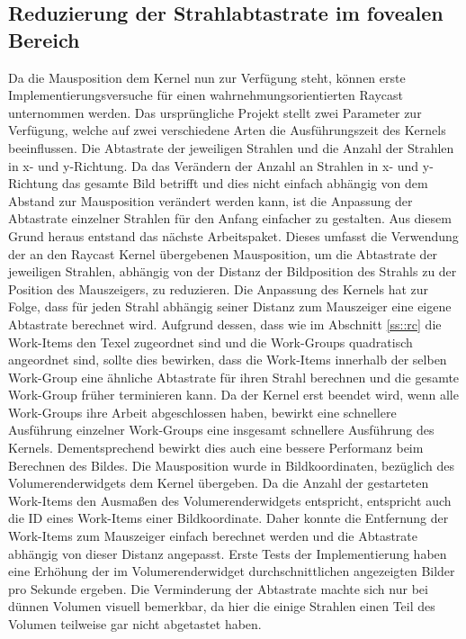\subsection*{Reduzierung der Strahlabtastrate im fovealen Bereich}
Da die Mausposition dem Kernel nun zur Verfügung steht, können erste Implementierungsversuche für einen wahrnehmungsorientierten Raycast unternommen werden.
Das ursprüngliche Projekt stellt zwei Parameter zur Verfügung, welche auf zwei verschiedene Arten die Ausführungszeit des Kernels beeinflussen.
Die Abtastrate der jeweiligen Strahlen und die Anzahl der Strahlen in x- und y-Richtung.
Da das Verändern der Anzahl an Strahlen in x- und y- Richtung das gesamte Bild betrifft und dies nicht einfach abhängig von dem Abstand zur Mausposition verändert werden kann, ist die Anpassung der Abtastrate einzelner Strahlen für den Anfang einfacher zu gestalten.
Aus diesem Grund heraus entstand das nächste Arbeitspaket.
Dieses umfasst die Verwendung der an den Raycast Kernel übergebenen Mausposition, um die Abtastrate der jeweiligen Strahlen, abhängig von der Distanz der Bildposition des Strahls zu der Position des Mauszeigers, zu reduzieren.
Die Anpassung des Kernels hat zur Folge, dass für jeden Strahl abhängig seiner Distanz zum Mauszeiger eine eigene Abtastrate berechnet wird.
Aufgrund dessen, dass wie im Abschnitt \ref{ss::rc} die Work-Items den Texel zugeordnet sind und die Work-Groups quadratisch angeordnet sind, sollte dies bewirken, dass die Work-Items innerhalb der selben Work-Group eine ähnliche Abtastrate für ihren Strahl berechnen und die gesamte Work-Group früher terminieren kann.
Da der Kernel erst beendet wird, wenn alle Work-Groups ihre Arbeit abgeschlossen haben, bewirkt eine schnellere Ausführung einzelner Work-Groups eine insgesamt schnellere Ausführung des Kernels.
Dementsprechend bewirkt dies auch eine bessere Performanz beim Berechnen des Bildes.
Die Mausposition wurde in Bildkoordinaten, bezüglich des Volumerenderwidgets dem Kernel übergeben.
Da die Anzahl der gestarteten Work-Items den Ausmaßen des Volumerenderwidgets entspricht, entspricht auch die ID eines Work-Items einer Bildkoordinate.
Daher konnte die Entfernung der Work-Items zum Mauszeiger einfach berechnet werden und die Abtastrate abhängig von dieser Distanz angepasst.
Erste Tests der Implementierung haben eine Erhöhung der im Volumerenderwidget durchschnittlichen angezeigten Bilder pro Sekunde ergeben.
Die Verminderung der Abtastrate machte sich nur bei dünnen Volumen visuell bemerkbar, da hier die einige Strahlen einen Teil des Volumen teilweise gar nicht abgetastet haben.

